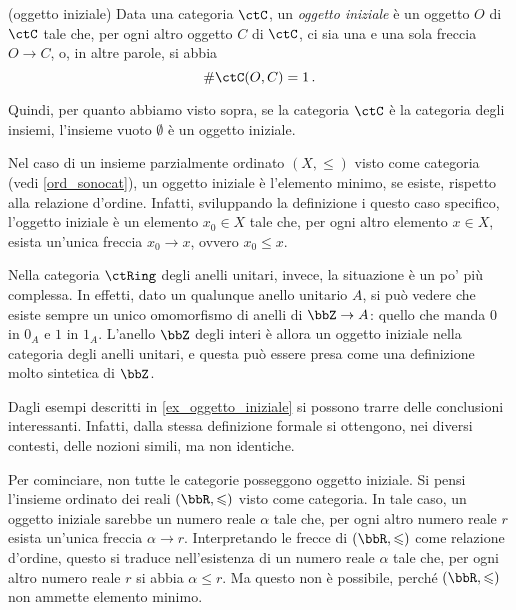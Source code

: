 \begin{example}(oggetto iniziale)\label{ex_oggetto_iniziale}
	Data una categoria \(\ctC\), un \emph{oggetto iniziale} è un oggetto \(O\) di \(\ctC\) tale che, per ogni altro oggetto \(C\) di \(\ctC\), ci sia una e una sola freccia \(O\to C\), o, in altre parole, si abbia
	\begin{equation}\label{def_oggetto_iniziale}
		\#\Hom\ctC(O,C)=1\,.
	\end{equation}

	Quindi, per quanto abbiamo visto sopra, se la categoria \(\ctC\) è la categoria degli insiemi, l'insieme vuoto \(\emptyset\)  è un oggetto iniziale.

	Nel caso di un insieme parzialmente ordinato \((X, \leqslant)\) visto come categoria (vedi \ref{ord_sonocat}), un oggetto iniziale è l'elemento minimo, se esiste, rispetto alla relazione d'ordine. Infatti, sviluppando la definizione i questo caso specifico, l'oggetto iniziale è un elemento \(x_0\in X\) tale che, per ogni altro elemento \(x\in X\), esista un'unica freccia \(x_0\to x\), ovvero \(x_0\leqslant x\).

	Nella categoria \(\ctRing\) degli anelli unitari, invece, la situazione è un po' più complessa. In effetti, dato un qualunque anello  unitario \(A\), si può vedere che esiste sempre un unico omomorfismo di anelli di \(\bbZ\to A\): quello che manda \(0\) in \(0_A\) e \(1\) in \(1_A\). L'anello \(\bbZ\) degli interi è allora un oggetto iniziale nella categoria degli anelli unitari, e questa può essere presa come una definizione molto sintetica di \(\bbZ\).
\end{example}

Dagli esempi descritti in  \ref{ex_oggetto_iniziale} si possono trarre delle conclusioni interessanti. Infatti, dalla stessa definizione formale si ottengono, nei diversi contesti, delle nozioni simili, ma non identiche.

Per cominciare, non tutte le categorie posseggono oggetto iniziale. Si pensi l'insieme ordinato dei reali \((\bbR,\leqslant)\) visto come categoria. In tale caso,  un oggetto iniziale sarebbe un numero reale \(\alpha\) tale che, per ogni altro numero reale \(r\) esista un'unica freccia \(\alpha\to r\). Interpretando le frecce di \((\bbR,\leqslant)\) come relazione d'ordine, questo si traduce nell'esistenza di un numero reale \(\alpha\) tale che, per ogni altro numero reale \(r\) si abbia \(\alpha\leqslant r\). Ma questo non è possibile, perché \((\bbR,\leqslant)\) non ammette elemento minimo.

